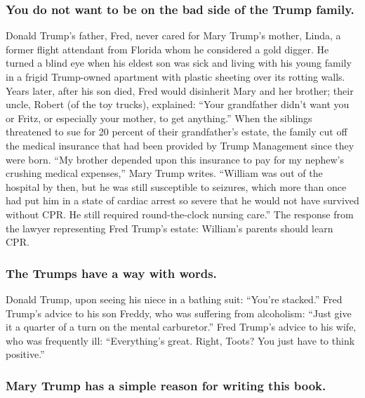 \hypertarget{you-do-not-want-to-be-on-the-bad-side-of-the-trump-family}{%
\subsubsection{You do not want to be on the bad side of the Trump
family.}\label{you-do-not-want-to-be-on-the-bad-side-of-the-trump-family}}

Donald Trump's father, Fred, never cared for Mary Trump's mother, Linda,
a former flight attendant from Florida whom he considered a gold digger.
He turned a blind eye when his eldest son was sick and living with his
young family in a frigid Trump-owned apartment with plastic sheeting
over its rotting walls. Years later, after his son died, Fred would
disinherit Mary and her brother; their uncle, Robert (of the toy
trucks), explained: ``Your grandfather didn't want you or Fritz, or
especially your mother, to get anything.'' When the siblings threatened
to sue for 20 percent of their grandfather's estate, the family cut off
the medical insurance that had been provided by Trump Management since
they were born. ``My brother depended upon this insurance to pay for my
nephew's crushing medical expenses,'' Mary Trump writes. ``William was
out of the hospital by then, but he was still susceptible to seizures,
which more than once had put him in a state of cardiac arrest so severe
that he would not have survived without CPR. He still required
round-the-clock nursing care.'' The response from the lawyer
representing Fred Trump's estate: William's parents should learn CPR.

\hypertarget{the-trumps-have-a-way-with-words}{%
\subsubsection{The Trumps have a way with
words.}\label{the-trumps-have-a-way-with-words}}

Donald Trump, upon seeing his niece in a bathing suit: ``You're
stacked.'' Fred Trump's advice to his son Freddy, who was suffering from
alcoholism: ``Just give it a quarter of a turn on the mental
carburetor.'' Fred Trump's advice to his wife, who was frequently ill:
``Everything's great. Right, Toots? You just have to think positive.''

\hypertarget{mary-trump-has-a-simple-reason-for-writing-this-book}{%
\subsubsection{Mary Trump has a simple reason for writing this
book.}\label{mary-trump-has-a-simple-reason-for-writing-this-book}}

